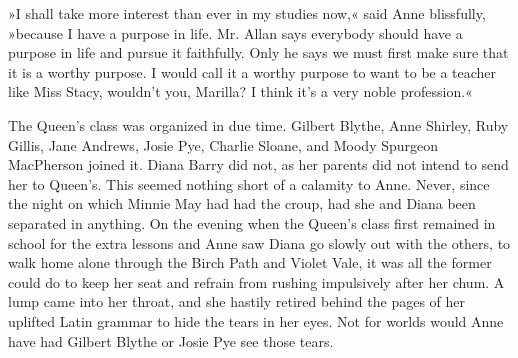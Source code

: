 »I shall take more interest than ever in my studies now,« said Anne blissfully, »because I have a purpose in life. Mr. Allan says everybody should have a purpose in life and pursue it faithfully. Only he says we must first make sure that it is a worthy purpose. I would call it a worthy purpose to want to be a teacher like Miss Stacy, wouldn't you, Marilla? I think it's a very noble profession.«

The Queen's class was organized in due time. Gilbert Blythe, Anne Shirley, Ruby Gillis, Jane Andrews, Josie Pye, Charlie Sloane, and Moody Spurgeon MacPherson joined it. Diana Barry did not, as her parents did not intend to send her to Queen's. This seemed nothing short of a calamity to Anne. Never, since the night on which Minnie May had had the croup, had she and Diana been separated in anything. On the evening when the Queen's class first remained in school for the extra lessons and Anne saw Diana go slowly out with the others, to walk home alone through the Birch Path and Violet Vale, it was all the former could do to keep her seat and refrain from rushing impulsively after her chum. A lump came into her throat, and she hastily retired behind the pages of her uplifted Latin grammar to hide the tears in her eyes. Not for worlds would Anne have had Gilbert Blythe or Josie Pye see those tears.

